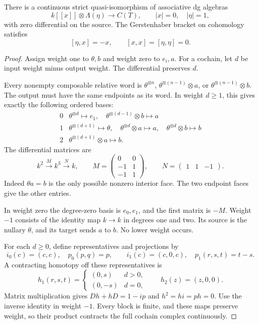 \begin{theorem}\label{cbc:rc:thm:centre}
There is a continuous strict quasi-isomorphism of associative dg algebras
\begin{equation}\label{cbc:rc:eq:centre}
 k[[x]]\otimes\Lambda(\eta)\longrightarrow C(T),
 \qquad |x|=0,\quad |\eta|=1,
\end{equation}
with zero differential on the source.  The Gerstenhaber bracket on
cohomology satisfies
\[
 [\eta,x]=-x,\qquad [x,x]=[\eta,\eta]=0.
\]
\end{theorem}
\begin{proof}
Assign weight one to \(\theta,b\) and weight zero to \(e_i,a\).
For a cochain, let \(d\) be input weight minus output weight.
The differential preserves \(d\).

Every nonempty composable relative word is
\(\theta^{\otimes n}\), \(\theta^{\otimes(n-1)}\otimes a\), or
\(\theta^{\otimes(n-1)}\otimes b\).
The output must have the same endpoints as its word.  In weight
\(d\geq1\), this gives exactly the following ordered bases:
\[
\begin{array}{c|l}
0&\theta^{\otimes d}\mapsto e_1,\quad
  \theta^{\otimes(d-1)}\otimes b\mapsto a\\
1&\theta^{\otimes(d+1)}\mapsto\theta,\quad
  \theta^{\otimes d}\otimes a\mapsto a,\quad
  \theta^{\otimes d}\otimes b\mapsto b\\
2&\theta^{\otimes(d+1)}\otimes a\mapsto b.
\end{array}
\]
The differential matrices are
\begin{equation}\label{cbc:rc:eq:blocks}
 k^2\xrightarrow{M}k^3\xrightarrow{N}k,
 \qquad
 M=\begin{pmatrix}0&0\\-1&1\\-1&1\end{pmatrix},
 \qquad N=\begin{pmatrix}1&1&-1\end{pmatrix}.
\end{equation}
Indeed \(\theta a=b\) is the only possible nonzero interior face.
The two endpoint faces give the other entries.

In weight zero the degree-zero basis is \(e_0,e_1\), and the first
matrix is \(-M\).  Weight \(-1\) consists of the identity map
\(k\to k\) in degrees one and two. Its source is the nullary
\(\theta\), and its target sends \(a\) to \(b\).
No lower weight occurs.

For each \(d\geq0\), define representatives and projections by
\[
 i_0(c)=(c,c),\quad p_0(p,q)=p,\qquad
 i_1(c)=(c,0,c),\quad p_1(r,s,t)=t-s.
\]
A contracting homotopy off these representatives is
\[
 h_1(r,s,t)=
 \begin{cases}(0,s)&d>0,\\(0,-s)&d=0,\end{cases}
 \qquad h_2(z)=(z,0,0).
\]
Matrix multiplication gives \(Dh+hD=1-ip\) and
\(h^2=hi=ph=0\).  Use the inverse identity in weight \(-1\).
Every block is finite, and these maps preserve weight, so their product
contracts the full cochain complex continuously.


\end{proof}
